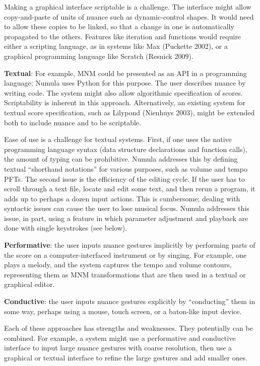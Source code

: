 \documentclass[letterpaper, 12pt]{article}
\begin{document}
Making a graphical interface scriptable is a challenge.
The interface might allow copy-and-paste of units of nuance
such as dynamic-control shapes.
It would need to allow these copies to be linked,
so that a change in one is automatically propagated to the others.
Features like iteration and functions
would require either a scripting language,
as in systems like Max (Puckette 2002),
or a graphical programming language like Scratch (Resnick 2009).

\textbf{Textual}:
For example, MNM could be presented as an API in a programming language;
Numula uses Python for this purpose.
The user describes nuance by writing code.
The system might also allow algorithmic specification of scores.
Scriptability is inherent in this approach.
Alternatively, an existing system for textual score specification,
such as Lilypond (Nienhuys 2003),
might be extended both to include nuance and to be scriptable.

Ease of use is a challenge for textual systems.
First, if one uses the native programming language syntax
(data structure declarations and function calls),
the amount of typing can be prohibitive.
Numula addresses this by defining
textual ``shorthand notations'' for various purposes,
such as volume and tempo PFTs.
The second issue is the efficiency of the editing cycle.
If the user has to scroll through a text file,
locate and edit some text, and then rerun a program,
it adds up to perhaps a dozen input actions.
This is cumbersome; dealing with syntactic issues can cause
the user to lose musical focus.
Numula addresses this issue, in part,
using a feature in which parameter adjustment
and playback are done with single keystrokes (see below).

\textbf{Performative}:
the user inputs nuance gestures implicitly by performing parts of the score
on a computer-interfaced instrument or by singing.
For example, one plays a melody,
and the system captures the tempo and volume contours,
representing them as MNM transformations
that are then used in a textual or graphical editor.

\textbf{Conductive}:
the user inputs nuance gestures explicitly by ``conducting'' them in some way,
perhaps using a mouse, touch screen, or a baton-like input device.

Each of these approaches has strengths and weaknesses.
They potentially can be combined.
For example, a system might use a performative and conductive interface
to input large nuance gestures with coarse resolution,
then use a graphical or textual interface to refine the large gestures
and add smaller ones.
\end{document}
